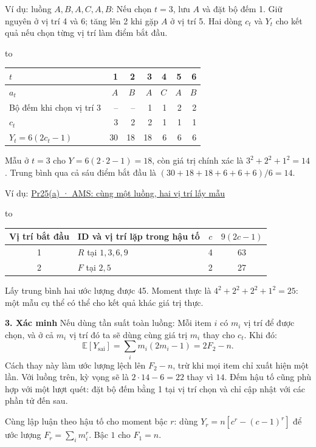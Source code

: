 \documentclass[10pt,a4paper,twocolumn]{article}
\newcommand{\key}[1]{#1:\enspace}
\newcommand{\blocklabel}[1]{\par\noindent#1\par\nobreak}
\newcommand{\qlink}[2]{\hyperref[question:#1]{#2}}
\newenvironment{example}[2]{%
  \par\addvspace{6pt}\noindent
  \raggedright
  \blocklabel{Ví dụ: \qlink{#1}{#2}}%
}{\par\addvspace{4pt}}
\newenvironment{examtable}[1]{%
  \par\addvspace{2pt}\noindent\hbox to \linewidth\bgroup\hfil
  \setlength{\tabcolsep}{4pt}%
  \renewcommand{\arraystretch}{1.12}\begin{tabular}{#1}%
}{\end{tabular}\hfil\egroup\par\addvspace{2pt}}
\newcommand{\unitheading}[2]{%
  \par\addvspace{1pt}\noindent\textbf{#1. #2}\enspace}
\newcommand{\unitverification}{\unitheading{3}{Xác minh}}
\begin{document}
\key{Ví dụ: luồng $A,B,A,C,A,B$} Nếu chọn $t=3$, lưu $A$ và đặt bộ đếm 1. Giữ nguyên ở vị trí 4 và 6; tăng lên 2 khi gặp $A$ ở vị trí 5. Hai dòng $c_t$ và $Y_t$ cho kết quả nếu chọn từng vị trí làm điểm bắt đầu.
\begin{examtable}{@{}lrrrrrr@{}}
\toprule
$t$ & 1 & 2 & 3 & 4 & 5 & 6 \\
\midrule
$a_t$ & $A$ & $B$ & $A$ & $C$ & $A$ & $B$ \\
Bộ đếm khi chọn vị trí 3 & -- & -- & 1 & 1 & 2 & 2 \\
$c_t$ & 3 & 2 & 2 & 1 & 1 & 1 \\
$Y_t=6(2c_t-1)$ & 30 & 18 & 18 & 6 & 6 & 6 \\
\bottomrule
\end{examtable}
Mẫu ở $t=3$ cho $Y=6(2\cdot2-1)=18$, còn giá trị chính xác là $3^2+2^2+1^2=14$. Trung bình qua cả sáu điểm bắt đầu là $(30+18+18+6+6+6)/6=14$.

\begin{example}{Pr25}{Pr25(a) · AMS: cùng một luồng, hai vị trí lấy mẫu}
\begin{examtable}{@{}c l c c@{}}
\toprule
Vị trí bắt đầu & ID và vị trí lặp trong hậu tố & $c$ & $9(2c-1)$ \\
\midrule
1 & $R$ tại $1,3,6,9$ & 4 & 63 \\
2 & $F$ tại $2,5$ & 2 & 27 \\
\bottomrule
\end{examtable}
Lấy trung bình hai ước lượng được 45. Moment thực là $4^2+2^2+2^2+1^2=25$: một mẫu cụ thể có thể cho kết quả khác giá trị thực.
\end{example}


\unitverification
\key{Nếu dùng tần suất toàn luồng} Mỗi item $i$ có $m_i$ vị trí để được chọn, và ở cả $m_i$ vị trí đó ta sẽ dùng cùng giá trị $m_i$ thay cho $c_t$. Khi đó:
\[
\mathbb E[Y_{\mathrm{sai}}]
  =\sum_i m_i(2m_i-1)=2F_2-n .
\]
Cách thay này làm ước lượng lệch lên $F_2-n$, trừ khi mọi item chỉ xuất hiện một lần. Với luồng trên, kỳ vọng sẽ là $2\cdot14-6=22$ thay vì $14$. Đếm hậu tố cũng phù hợp với một lượt quét: đặt bộ đếm bằng 1 tại vị trí chọn và chỉ cập nhật với các phần tử đến sau.

Cùng lập luận theo hậu tố cho moment bậc $r$: dùng $Y_r=n[c^r-(c-1)^r]$ để ước lượng $F_r=\sum_i m_i^r$. Bậc $1$ cho $F_1=n$.
\end{document}
